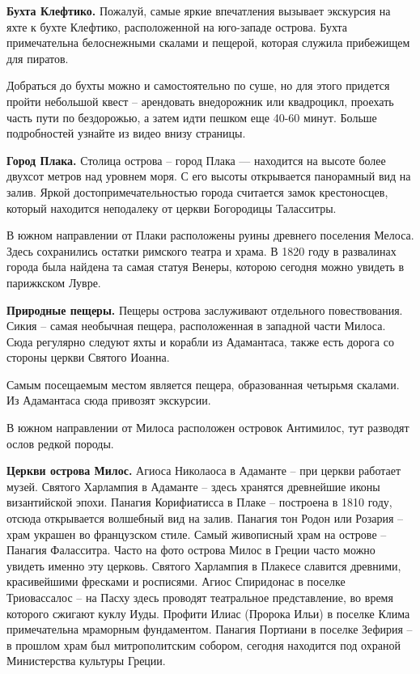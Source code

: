 \textbf{Бухта Клефтико.}
Пожалуй, самые яркие впечатления вызывает экскурсия на яхте к бухте Клефтико, расположенной на юго-западе острова. Бухта примечательна белоснежными скалами и пещерой, которая служила прибежищем для пиратов.

Добраться до бухты можно и самостоятельно по суше, но для этого придется пройти небольшой квест – арендовать внедорожник или квадроцикл, проехать часть пути по бездорожью, а затем идти пешком еще 40-60 минут. Больше подробностей узнайте из видео внизу страницы.

\textbf{Город Плака.}
Столица острова – город Плака — находится на высоте более двухсот метров над уровнем моря. С его высоты открывается панорамный вид на залив. Яркой достопримечательностью города считается замок крестоносцев, который находится неподалеку от церкви Богородицы Таласситры.

В южном направлении от Плаки расположены руины древнего поселения Мелоса. Здесь сохранились остатки римского театра и храма. В 1820 году в развалинах города была найдена та самая статуя Венеры, которою сегодня можно увидеть в парижкском Лувре.

\textbf{Природные пещеры.}
Пещеры острова заслуживают отдельного повествования. Сикия – самая необычная пещера, расположенная в западной части Милоса. Сюда регулярно следуют яхты и корабли из Адамантаса, также есть дорога со стороны церкви Святого Иоанна.

Самым посещаемым местом является пещера, образованная четырьмя скалами. Из Адамантаса сюда привозят экскурсии.

В южном направлении от Милоса расположен островок Антимилос, тут разводят ослов редкой породы.

\textbf{Церкви острова Милос.}
Агиоса Николаоса в Адаманте – при церкви работает музей. Святого Харлампия в Адаманте – здесь хранятся древнейшие иконы византийской эпохи. Панагия Корифиатисса в Плаке – построена в 1810 году, отсюда открывается волшебный вид на залив. Панагия тон Родон или Розария – храм украшен во французском стиле. Самый живописный храм на острове – Панагия Фаласситра. Часто на фото острова Милос в Греции часто можно увидеть именно эту церковь. Святого Харлампия в Плакесе славится древними, красивейшими фресками и росписями. Агиос Спиридонас в поселке Триовассалос – на Пасху здесь проводят театральное представление, во время которого сжигают куклу Иуды.
Профити Илиас (Пророка Ильи) в поселке Клима примечательна мраморным фундаментом.
Панагия Портиани в поселке Зефирия – в прошлом храм был митрополитским собором, сегодня находится под охраной Министерства культуры Греции.

